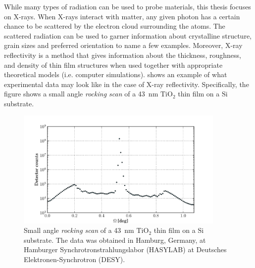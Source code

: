 \documentclass[10pt,twoside, b5paper,pdftex]{report}
\newcommand{\chem}[1]{\ensuremath{\mathrm{#1}}}
\begin{document}
While many types of radiation can be used to probe materials, this thesis focuses on X-rays.
When X-rays interact with matter, any given photon has a certain chance to be scattered by the electron cloud surrounding the atoms. The scattered radiation can be used to garner information about  crystalline structure, grain sizes and preferred orientation to name a few examples. Moreover, X-ray reflectivity is a method that gives information about the thickness, roughness, and density of thin film structures when used together with appropriate theoretical models (i.e. computer simulations).  shows an example of what experimental data may look like in the case of X-ray reflectivity. Specifically, the figure shows a small angle {\it rocking scan} of a \SI{43}{\nano\meter} \chem{TiO_2} thin film on a \chem{Si} substrate. 
\begin{figure}[htbp]
	\begin{center}
		\includegraphics[width=0.9\textwidth]{figures/somedata.pdf}		
	\end{center}
	\caption{Small angle {\it rocking scan} of a \SI{43}{\nano\meter} \chem{TiO_2} thin film on a \chem{Si} substrate. The data was obtained in Hamburg, Germany, at Hamburger Synchrotronstrahlungslabor (HASYLAB) at Deutsches Elektronen-Synchrotron (DESY).\label{fig:40nmfilm}}
\end{figure}





\end{document}
